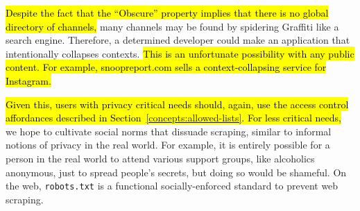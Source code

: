 \hl{%
Despite the fact that the ``Obscure'' property implies that
there is no global directory of channels,
}%
many channels may be found by spidering Graffiti like a search engine.
Therefore, a determined
developer could make an application that intentionally collapses contexts.
\hl{%
This is an unfortunate possibility with any public content.
For example, snoopreport.com sells a context-collapsing service for Instagram.
}%

\hl{%
Given this, users with privacy critical needs should, again, use the
access control affordances described in Section~{\ref{concepts:allowed-lists}}.
For less critical needs,
}%
we hope to cultivate social norms that dissuade scraping, similar to informal notions of privacy in the real world.
For example, it is entirely possible for a person in the real world
to attend various support groups, like alcoholics anonymous,
just to spread people's secrets, but doing so would be shameful.
On the web, \texttt{robots.txt} is a functional socially-enforced standard
to prevent web scraping.






